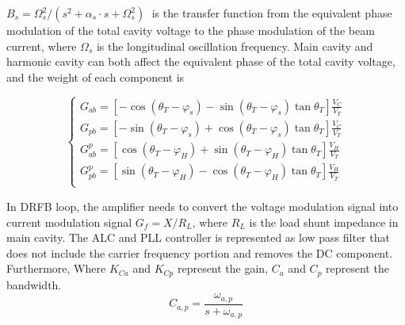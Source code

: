 \documentclass[letterpaper,
               nospread,     %
               ]{jacow}
\begin{document}
${{B}_{s}}={\Omega _{s}^{2}}/{\left( {{s}^{2}}+{{\alpha }_{s}}\cdot s+\Omega _{s}^{2} \right)}\;$ is
the transfer function from the equivalent phase modulation of the total cavity voltage to the phase modulation of the beam current, where
$\Omega _s^{}$  is the longitudinal oscillation frequency\cite{ref9}.
Main cavity and harmonic cavity can both affect the equivalent phase of the total cavity voltage\cite{ref10}, and the weight of each component is
\begin{small}
   \begin{equation}\label{eq:label}
      \left\{ \begin{matrix}
         G_{ab}=[-\cos ({{\theta }_{T}}-{{\varphi }_{s}})-\sin ({{\theta }_{T}}-{{\varphi }_{s}})\tan {{\theta }_{T}}]\frac{{{V}_{C}}}{{{V}_{T}}}    \\
         G_{pb}=[-\sin ({{\theta }_{T}}-{{\varphi }_{s}})+\cos ({{\theta }_{T}}-{{\varphi }_{s}})\tan {{\theta }_{T}}]\frac{{{V}_{C}}}{{{V}_{T}}}    \\
         G_{ab}^{p}=[\cos ({{\theta }_{T}}-{{\varphi }_{H}})+\sin ({{\theta }_{T}}-{{\varphi }_{H}})\tan {{\theta }_{T}}]\frac{{{V}_{H}}}{{{V}_{T}}} \\
         G_{pb}^{p}=[\sin ({{\theta }_{T}}-{{\varphi }_{H}})-\cos ({{\theta }_{T}}-{{\varphi }_{H}})\tan {{\theta }_{T}}]\frac{{{V}_{H}}}{{{V}_{T}}} \\
      \end{matrix} \right.
   \end{equation}
\end{small}
\hspace*{1em}In DRFB loop, the amplifier needs to convert the voltage modulation signal into current modulation signal
${{G}_{f}}={X}/{{{R}_{L}}}$, where ${{R}_{L}}$ is the load shunt impedance in main cavity. The ALC and PLL controller is represented
as low pass filter that does not include the carrier frequency portion and removes the DC component\cite{ref11}. Furthermore,
Where ${{K}_{Ca}}$ and ${{K}_{Cp}}$ represent the gain, ${{C}_{a}}$ and ${{C}_{p}}$ represent the bandwidth.
\begin{equation}\label{eq:label}
   {{C}_{a,p}}=\frac{{{\omega }_{a,p}}}{s+{{\omega }_{a,p}}}
\end{equation}
\end{document}
